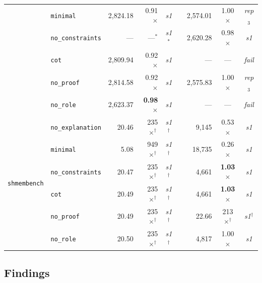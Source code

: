 \begin{table}[t]
{\begin{tabular}{@{}llrrcrrcc@{}}
  & \texttt{minimal}         & 2{,}824.18 & 0.91$\times$          & \textit{s1}      && 2{,}574.01   & 1.00$\times$ & \textit{rep}$_3$ \\
  & \texttt{no\_constraints} &        --- & ---$^*$               & \textit{s1}$^*$  && 2{,}620.28   & 0.98$\times$ & \textit{s1}      \\
  & \texttt{cot}             & 2{,}809.94 & 0.92$\times$          & \textit{s1}      &&          --- & ---          & \textit{fail}    \\
  & \texttt{no\_proof}       & 2{,}814.58 & 0.92$\times$          & \textit{s1}      && 2{,}575.83   & 1.00$\times$ & \textit{rep}$_3$ \\
  & \texttt{no\_role}        & 2{,}623.37 & \textbf{0.98}$\times$ & \textit{s1}      &&          --- & ---          & \textit{fail}    \\
\midrule
\multirow{6}{*}{\texttt{shmembench}}
  & \texttt{no\_explanation} &    20.46 & 235$\times^\dagger$          & \textit{s1}$^\dagger$ &&  9{,}145 & 0.53$\times$          & \textit{s1}           \\
  & \texttt{minimal}         &     5.08 & 949$\times^\dagger$          & \textit{s1}$^\dagger$ && 18{,}735 & 0.26$\times$          & \textit{s1}           \\
  & \texttt{no\_constraints} &    20.47 & 235$\times^\dagger$          & \textit{s1}$^\dagger$ &&  4{,}661 & \textbf{1.03}$\times$ & \textit{s1}           \\
  & \texttt{cot}             &    20.49 & 235$\times^\dagger$          & \textit{s1}$^\dagger$ &&  4{,}661 & \textbf{1.03}$\times$ & \textit{s1}           \\
  & \texttt{no\_proof}       &    20.49 & 235$\times^\dagger$          & \textit{s1}$^\dagger$ &&    22.66 & 213$\times^\dagger$   & \textit{s1}$^\dagger$ \\
  & \texttt{no\_role}        &    20.50 & 235$\times^\dagger$          & \textit{s1}$^\dagger$ &&  4{,}817 & 1.00$\times$          & \textit{s1}           \\
\bottomrule
\end{tabular}%
}
\end{table}

\subsection{Findings}
\label{sec:analysis}
